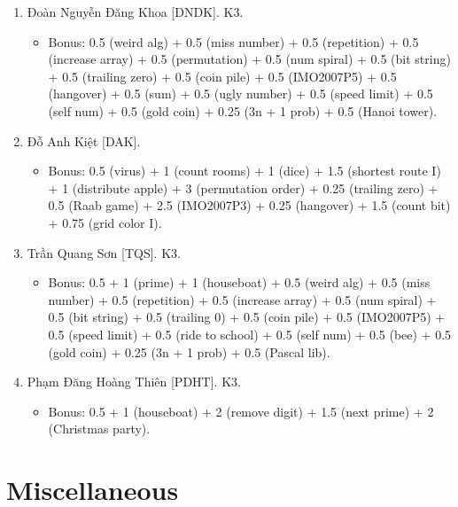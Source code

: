 \documentclass{article}
\begin{document}
\begin{enumerate}
    \item {\sc Đoàn Nguyễn Đăng Khoa [DNDK].} K3.
    \begin{itemize}
        \item Bonus: 0.5 (weird alg) + 0.5 (miss number) + 0.5 (repetition) + 0.5 (increase array) + 0.5 (permutation) + 0.5 (num spiral) + 0.5 (bit string) + 0.5 (trailing zero) + 0.5 (coin pile) + 0.5 (IMO2007P5) + 0.5 (hangover) + 0.5 (sum) + 0.5 (ugly number) + 0.5 (speed limit) + 0.5 (self num) + 0.5 (gold coin) + 0.25 (3n + 1 prob) + 0.5 (Hanoi tower).
    \end{itemize}
	\item {\sc Đỗ Anh Kiệt [DAK].}
	\begin{itemize}
		\item Bonus: 0.5 (virus) + 1 (count rooms) + 1 (dice) + 1.5 (shortest route I)  + 1 (distribute apple) + 3 (permutation order) + 0.25 (trailing zero) + 0.5 (Raab game) + 2.5 (IMO2007P3) + 0.25 (hangover) + 1.5 (count bit) + 0.75 (grid color I).
	\end{itemize}
	\item {\sc Trần Quang Sơn [TQS].} K3.
	\begin{itemize}
		\item Bonus: 0.5 + 1 (prime) + 1 (houseboat) + 0.5 (weird alg) + 0.5 (miss number) + 0.5 (repetition) + 0.5 (increase array) + 0.5 (num spiral) + 0.5 (bit string) + 0.5 (trailing 0) + 0.5 (coin pile) + 0.5 (IMO2007P5) + 0.5 (speed limit) + 0.5 (ride to school) + 0.5 (self num) + 0.5 (bee) + 0.5 (gold coin) + 0.25 (3n + 1 prob) + 0.5 (Pascal lib).
	\end{itemize}
	\item {\sc Phạm Đăng Hoàng Thiên [PDHT].} K3.
		\begin{itemize}
		\item Bonus: 0.5 + 1 (houseboat) + 2 (remove digit) + 1.5 (next prime) + 2 (Christmas party).
	\end{itemize}
\end{enumerate}


\section{Miscellaneous}


\printbibliography[heading=bibintoc]
	
\end{document}
